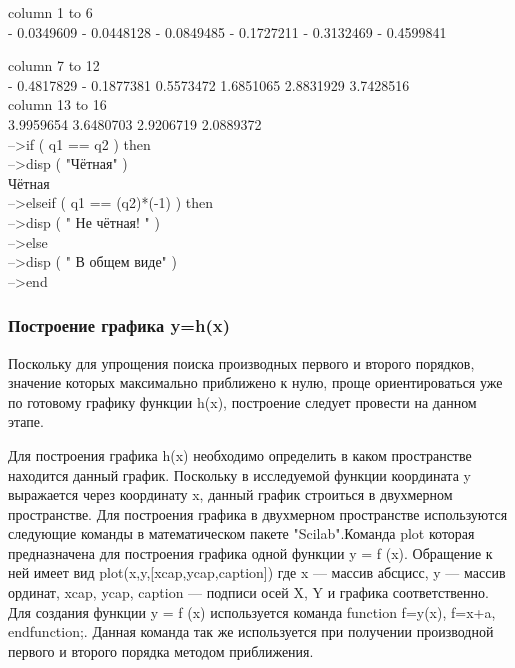 \documentclass[russian,utf8,nocolumnxxxi,nocolumnxxxii]{eskdtext}
\begin{document}
         column 1 to 6\\

  - 0.0349609  - 0.0448128  - 0.0849485  - 0.1727211  - 0.3132469  - 0.4599841

         column  7 to 12\\

  - 0.4817829  - 0.1877381    0.5573472    1.6851065    2.8831929    3.7428516  \\

         column 13 to 16\\

    3.9959654    3.6480703    2.9206719    2.0889372 \\

-->if ( q1 == q2 ) then\\
-->disp ( "Чётная" )\\

 Чётная  \\
-->elseif ( q1 == (q2)*(-1) ) then\\
-->disp ( " Не чётная! " )\\
-->else\\
-->disp ( " В общем виде" )\\
-->end\\

\subsubsection{Построение графика y=h(x)}

Поскольку для упрощения поиска производных первого и второго порядков, значение которых максимально приближено к нулю, проще ориентироваться уже по готовому графику функции h(x), построение следует провести на данном этапе.

Для построения графика h(x) необходимо определить в каком пространстве находится данный график. Поскольку в исследуемой функции координата y выражается через координату x, данный график строиться в двухмерном пространстве. Для построения графика в двухмерном пространстве используются следующие команды в математическом пакете "Scilab".Команда plot которая предназначена для построения графика одной функции y = f (x). Обращение к ней имеет вид plot(x,y,[xcap,ycap,caption]) где x — массив абсцисс, y — массив ординат, xcap, ycap, caption — подписи осей X, Y и графика соответственно. Для создания функции y = f (x) используется команда function  f=y(x), f=x+a, endfunction;. Данная команда так же используется при получении производной первого и второго порядка методом приближения.
\end{document}
